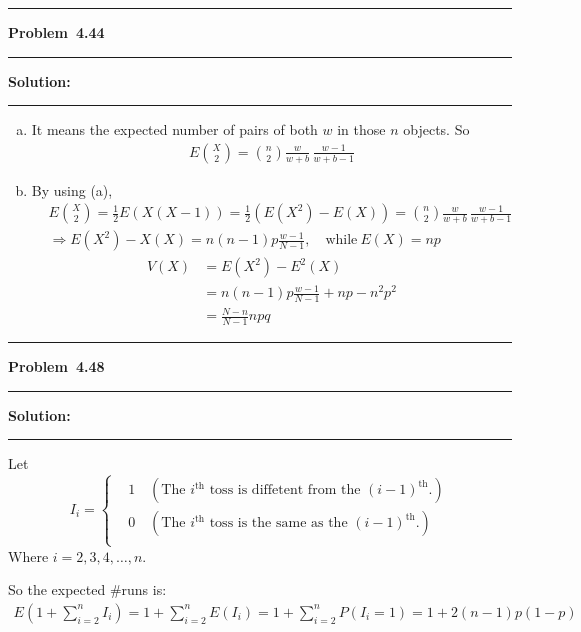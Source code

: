 \documentclass[10.5pt]{article}
\newcommand\question[1]{\vspace{.2in}\hrule\vspace{0.04in}\textbf{Problem\ #1}\vspace{.4em}\hrule\vspace{.10in}}
\newcommand\Solution{\vspace{.3in}\textbf{Solution:}\vspace{.5em}\hrule\vspace{.08in}\par}
\begin{document}
\question{4.44}
\Solution{}
\begin{enumerate}[(a)]
	\item It means the expected number of pairs of both $w$ in those $n$ objects.
	So \begin{align*}
		E\binom{X}{2} = \binom{n}{2}\frac{w}{w+b}\, \frac{w-1}{w+b-1}
	\end{align*}
	\item By using (a), \begin{align*}
		&E\binom{X}{2} = \frac{1}{2}E(X(X-1)) 
		= \frac{1}{2}(E(X^2) - E(X)) = \binom{n}{2}\frac{w}{w+b}\, \frac{w-1}{w+b-1}\\[10pt]
		&\Rightarrow E(X^2) - X(X) = n(n - 1)p\frac{w-1}{N-1},\quad\text{while}\ E(X) = np
	\end{align*}
	\begin{align*}
		V(X) 
		&= E(X^2) - E^2(X)\\[6pt]
		&=n(n - 1)p\frac{w - 1}{N-1}+np-n^2p^2\\[6pt]
		&=\frac{N-n}{N-1}npq
	\end{align*}
\end{enumerate}

\vspace{3cm}

\question{4.48}
\Solution{}
Let \begin{equation*}
	I_i = \begin{cases}
		&1\quad(\text{The $i^{\text{th}}$ toss is diffetent from the $(i - 1)^{\text{th}}$.})\\[6pt]
		&0\quad(\text{The $i^{\text{th}}$ toss is the same as the $(i - 1)^{\text{th}}$.})\\
	\end{cases}
\end{equation*}
Where $i = 2, 3, 4, \dots, n$.

So the expected \#runs is:
\begin{align*}
	E(1+\sum_{i = 2}^n I_i) = 1 + \sum_{i = 2}^n E(I_i) = 1+\sum_{i = 2}^n P(I_i = 1) = 1+2(n-1)p(1-p)
\end{align*}

\pagebreak
\end{document}
